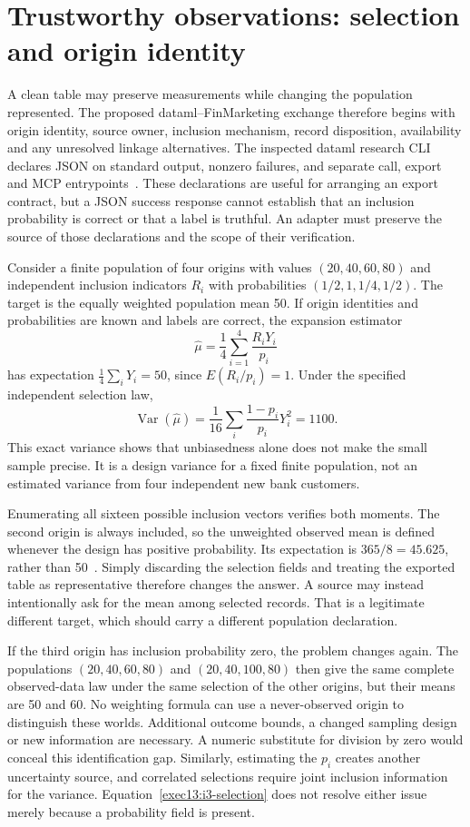 \section{Trustworthy observations: selection and origin identity}

A clean table may preserve measurements while changing the population
represented. The proposed dataml--FinMarketing exchange therefore begins
with origin identity, source owner, inclusion mechanism, record disposition,
availability and any unresolved linkage alternatives. The inspected dataml
research CLI declares JSON on standard output, nonzero failures, and separate
call, export and MCP entrypoints~\citep{exec13_i3_inspection}. These declarations
are useful for arranging an export contract, but a JSON success response
cannot establish that an inclusion probability is correct or that a label is
truthful. An adapter must preserve the source of those declarations and the
scope of their verification.

Consider a finite population of four origins with values
$(20,40,60,80)$ and independent inclusion indicators $R_i$ with probabilities
$(1/2,1,1/4,1/2)$. The target is the equally weighted population mean 50.
If origin identities and probabilities are known and labels are correct,
the expansion estimator
\begin{equation}
 \widehat\mu=\frac14\sum_{i=1}^4\frac{R_iY_i}{p_i}
 \label{exec13:i3-selection}
\end{equation}
has expectation $\frac14\sum_iY_i=50$, since $E(R_i/p_i)=1$.
Under the specified independent selection law,
\[
 \operatorname{Var}(\widehat\mu)
    =\frac1{16}\sum_i\frac{1-p_i}{p_i}Y_i^2=1100.
\]
This exact variance shows that unbiasedness alone does not make the small
sample precise. It is a design variance for a fixed finite population, not
an estimated variance from four independent new bank customers.

Enumerating all sixteen possible inclusion vectors verifies both moments.
The second origin is always included, so the unweighted observed mean is
defined whenever the design has positive probability. Its expectation is
$365/8=45.625$, rather than 50~\citep{exec13_i3_examples}. Simply discarding
the selection fields and treating the exported table as representative
therefore changes the answer. A source may instead intentionally ask for the
mean among selected records. That is a legitimate different target, which
should carry a different population declaration.

If the third origin has inclusion probability zero, the problem changes
again. The populations $(20,40,60,80)$ and $(20,40,100,80)$ then give the
same complete observed-data law under the same selection of the other
origins, but their means are 50 and 60. No weighting formula can use a
never-observed origin to distinguish these worlds. Additional outcome bounds,
a changed sampling design or new information are necessary. A numeric
substitute for division by zero would conceal this identification gap.
Similarly, estimating the $p_i$ creates another uncertainty source, and
correlated selections require joint inclusion information for the variance.
Equation~\eqref{exec13:i3-selection} does not resolve either issue merely
because a probability field is present.

